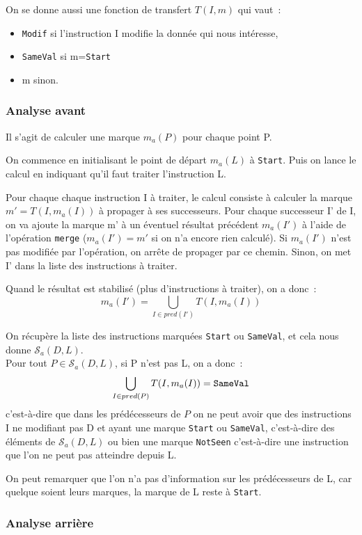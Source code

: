 \documentclass[a4paper,twoside]{article}
\newcommand{\sca}{\mathcal{S}_a}
\begin{document}
On se donne aussi une fonction de transfert $T(I,m)$ qui vaut~:
\begin{itemize}
  \item {\tt Modif} si l'instruction I modifie la donnée qui nous intéresse,
  \item {\tt SameVal} si m={\tt Start}
  \item m sinon.
\end{itemize}

\subsubsection{Analyse avant}

Il s'agit de calculer une marque $m_a(P)$ pour chaque point P.

On commence en initialisant le point de départ $m_a(L)$ à {\tt Start}.
Puis on lance le calcul en indiquant qu'il faut traiter l'instruction L.

Pour chaque chaque instruction I à traiter, le calcul consiste à
calculer la marque $m' = T(I, m_a(I))$ à propager à ses successeurs.
Pour chaque successeur I' de I, on va ajoute la marque m'
à un éventuel résultat précédent $m_a(I')$ 
à l'aide de l'opération {\tt merge}
($m_a(I')=m'$ si on n'a encore rien calculé).
Si $m_a(I')$ n'est pas modifiée par l'opération, on arrête de propager par ce
chemin. Sinon, on met I' dans la liste des instructions à traiter.

Quand le résultat est stabilisé (plus d'instructions à traiter), 
on a donc~:
$$
m_a(I') = \bigcup_{I \in pred(I')} T(I, m_a(I))
$$

On récupère la liste des instructions
marquées {\tt Start} ou {\tt SameVal}, et cela nous donne $\sca(D,L)$.\\

Pour tout $P \in \sca(D,L)$, si P n'est pas L, on a donc~:
$$
\bigcup_{I \in pred(P)} T(I, m_a(I)) = {\tt SameVal}
$$
c'est-à-dire que dans les prédécesseurs de $P$ on ne peut avoir que des
instructions I ne modifiant pas D et ayant une marque
{\tt Start} ou {\tt SameVal}, c'est-à-dire des éléments de $\sca(D,L)$
ou bien une marque {\tt NotSeen} c'est-à-dire une instruction que l'on ne peut
pas atteindre depuis L.

On peut remarquer que l'on n'a pas d'information sur les prédécesseurs de L,
car quelque soient leurs marques, la marque de L reste à  {\tt Start}.

\subsubsection{Analyse arrière}
\end{document}
